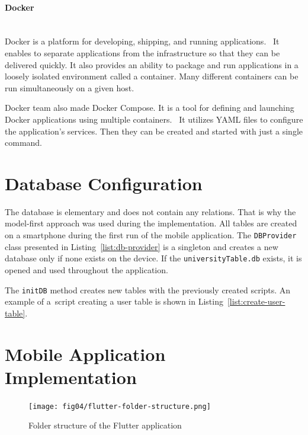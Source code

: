 \paragraph{\large{Docker}}\mbox{}\\[2pt]
Docker is a platform for developing, shipping, and running applications.~\cite{docker} It enables to separate applications from the infrastructure so that they can be delivered quickly. It also provides an ability to package and run applications in a loosely isolated environment called a container. Many different containers can be run simultaneously on a given host.

Docker team also made Docker Compose. It is a tool for defining and launching Docker applications using multiple containers.~\cite{docker-compose} It utilizes YAML files to configure the application’s services. Then they can be created and started with just a single command.

\section{Database Configuration}
The database is elementary and does not contain any relations. That is why the model-first approach was used during the implementation. All tables are created on a smartphone during the first run of the mobile application. The \texttt{DBProvider} class presented in Listing~\ref{list:db-provider} is a singleton and creates a new database only if none exists on the device. If the \texttt{universityTable.db} exists, it is opened and used throughout the application.



 The \texttt{initDB} method creates new tables with the previously created scripts. An example of a~script creating a user table is shown in Listing~\ref{list:create-user-table}.



\section{Mobile Application Implementation}
\begin{figure}[htb]
    \centering
    \texttt{[image: fig04/flutter-folder-structure.png]}
    \caption{Folder structure of the Flutter application}
    \label{fig:flutter-folder-structure}
\end{figure}

